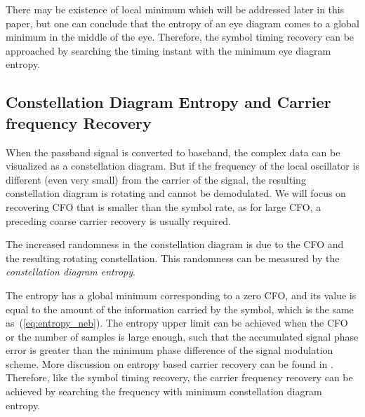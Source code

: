 \documentclass[journal,comsoc]{IEEEtran}
\begin{document}
There may be existence of local minimum which will be addressed later in this paper,
but one can conclude that the entropy of an eye diagram comes to a global minimum in the middle of the eye.
Therefore, the symbol timing recovery can be approached by searching the timing instant with the minimum eye diagram entropy.


\subsection{Constellation Diagram Entropy and Carrier frequency Recovery}
\label{sec:const_entp}
When the passband signal is converted to baseband, the complex data can be visualized as a constellation diagram.
But if the frequency of the local oscillator is  different (even very small) from the carrier of the signal, the resulting constellation diagram is rotating and cannot be demodulated.
We will focus on recovering CFO that is smaller than the symbol rate, as for large CFO, a preceding coarse carrier recovery is usually required.

The increased randomness in the constellation diagram is due to the CFO and the resulting rotating constellation. 
This randomness can be measured by the \textit{constellation diagram entropy}.

The entropy has a global minimum corresponding to a zero CFO, and its value is equal to the amount of the information carried by the symbol, which is the same as~(\ref{eq:entropy_neb}).
The entropy upper limit can be achieved when the CFO or the number of samples is large enough,
such that the accumulated signal phase error is greater than the minimum phase difference of the signal modulation scheme. 
More discussion on entropy based carrier recovery can be found in \cite{Pedzisz2006}.
Therefore, like the symbol timing recovery, the carrier frequency recovery can be achieved by searching the frequency with minimum constellation diagram entropy.
\end{document}

